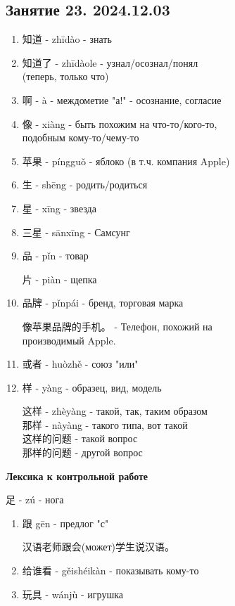 \LARGE
\newpage
\subsection{Занятие 23. 2024.12.03}
\begin{newwords}
	\begin{enumerate}\hfill
		\item 知道 - zhīdào - знать
		\item 知道了 - zhīdàole - узнал/осознал/понял\\
		(теперь, только что)
		\item 啊 - à - междометие "а!" - осознание, согласие
		\item 像 - xiàng - быть похожим на что-то/кого-то,\\
		подобным кому-то/чему-то
		\item 苹果 - píngguǒ - яблоко (в т.ч. компания Apple)
		\item 生 - shēng - родить/родиться
		\item 星 - xīng - звезда
		\item 三星 - sānxīng - Самсунг
		\item 品 - pǐn - товар
		\begin{newgraphem}
			片 - piàn - щепка
		\end{newgraphem}
		\item 品牌 - pǐnpái - бренд, торговая марка
		\begin{example}
			像苹果品牌的手机。 - Телефон, похожий на\\
			производимый Apple.
		\end{example}
		\item 或者 - huòzhě - союз "или"
		\item 样 - yàng - образец, вид, модель
		\begin{example}\hfill\break
			这样 - zhèyàng - такой, так, таким образом\\
			那样 - nàyàng - такого типа, вот такой\\
			这样的问题 - такой вопрос\\
			那样的问题 - другой вопрос
		\end{example}
	\end{enumerate}
\end{newwords}
\textbf{Лексика к контрольной работе}
\begin{newgraphem}
	足 - zú - нога
\end{newgraphem}
\begin{enumerate}
	\item 跟 gēn - предлог "с"
	\begin{example}
		汉语老师跟会(может)学生说汉语。
	\end{example}
	\item 给谁看 - gěishéikàn - показывать кому-то
	\item 玩具 - wánjù - игрушка
\end{enumerate}
